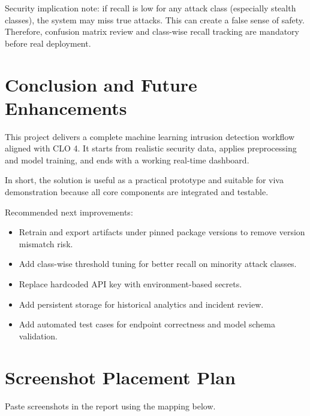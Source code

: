 \documentclass[12pt,a4paper]{article}
\begin{document}
Security implication note: if recall is low for any attack class (especially stealth classes), the system may miss true attacks. This can create a false sense of safety. Therefore, confusion matrix review and class-wise recall tracking are mandatory before real deployment.

\section{Conclusion and Future Enhancements}
This project delivers a complete machine learning intrusion detection workflow aligned with CLO 4. It starts from realistic security data, applies preprocessing and model training, and ends with a working real-time dashboard.

In short, the solution is useful as a practical prototype and suitable for viva demonstration because all core components are integrated and testable.

Recommended next improvements:
\begin{itemize}
\item Retrain and export artifacts under pinned package versions to remove version mismatch risk.
\item Add class-wise threshold tuning for better recall on minority attack classes.
\item Replace hardcoded API key with environment-based secrets.
\item Add persistent storage for historical analytics and incident review.
\item Add automated test cases for endpoint correctness and model schema validation.
\end{itemize}

\section{Screenshot Placement Plan}
Paste screenshots in the report using the mapping below.
\end{document}
